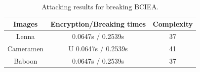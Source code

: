 \documentclass[final,3p,times,twocolumn]{elsarticle}
\begin{document}
\begin{table}[!htb]
	\label{tab:exp_result}
	\caption{Attacking results for breaking BCIEA.}
	\centering
	\begin{tabular}{ccc}
		\hline
		\textbf{Images}  & \textbf{Encryption/Breaking times} & \textbf{Complexity} \\
		\hline 
		Lenna & 0.0647s / 0.2539s  & 37  \\ 
		Cameramen & U 0.0647s / 0.2539s  & 41  \\  
		Baboon& 0.0647s / 0.2539s  & 37  \\ 
		\hline
	\end{tabular}
	\label{tab:exp_results}
\end{table}

\end{document}
